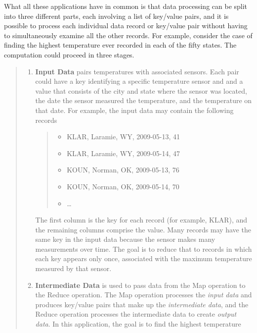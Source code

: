 What all these applications have in common is that data processing
can be split into three different parts, each involving a list of
key/value pairs, and it is possible to process each individual
data record or key/value pair without having to simultaneously
examine all the other records.  For
example, consider the case of finding the highest
temperature ever recorded in each of the fifty states.
The computation could proceed in three stages.
\begin{quote}
\begin{enumerate}
    \item \textbf{Input Data} pairs temperatures with associated sensors.
        Each pair could have a key identifying a
        specific temperature sensor and
        and a value that consists of the city and state where
        the sensor was located, the date the sensor measured
        the temperature, and the temperature on that date.
        For example, the input data may contain the following
        records
        \begin {quote}
        \begin{itemize}
            \item \textsf{KLAR, Laramie, WY, 2009-05-13, 41}
            \item \textsf{KLAR, Laramie, WY, 2009-05-14, 47}
            \item \textsf{KOUN, Norman,  OK, 2009-05-13, 76}
            \item \textsf{KOUN, Norman,  OK, 2009-05-14, 70}
            \item \dots
        \end{itemize}
        \end{quote}
        The first column is the key for each record (for example, KLAR),
        and the remaining columns comprise the value. Many
        records may have the same key in the input data because the
        sensor makes many measurements over time.
        The goal is to reduce that to records
        in which each key appears only once,
        associated with the maximum temperature measured by that sensor.
    \item \textbf{Intermediate Data} is used to pass data from
        the Map operation to the Reduce operation. The Map operation
        processes the \emph{input data} and produces key/value pairs
        that make up the \emph{intermediate data}, and the Reduce operation
        processes the intermediate data to create \emph{output data}.
        In this application, the goal is to find the highest temperature

\end{enumerate}
\end{quote}
